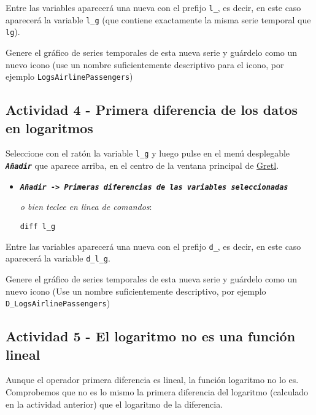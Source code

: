 \documentclass[11pt]{article}
\begin{document}
Entre las variables aparecerá una nueva con el prefijo \texttt{l\_}, es decir,
en este caso aparecerá la variable \texttt{l\_g} (que contiene exactamente la
misma serie temporal que \texttt{lg}).

Genere el gráfico de series temporales de esta nueva serie y guárdelo
como un nuevo icono (use un nombre suficientemente descriptivo para el
icono, por ejemplo \texttt{LogsAirlinePassengers})

{\vspace{0pt} \footnotesize \color{gray!70!black}
}

\subsection{Actividad 4 - Primera diferencia de los datos en logaritmos}
\label{sec:orgc6f27e0}

Seleccione con el ratón la variable \texttt{l\_g} y luego pulse en el menú desplegable \textbf{\emph{\texttt{Añadir}}} que aparece arriba, en el centro de la
ventana principal de \href{https://gretl.sourceforge.net/es.html}{Gretl}.
\begin{itemize}
\item \textbf{\emph{\texttt{Añadir -> Primeras diferencias de las variables seleccionadas}}}

{\vspace{0pt} \footnotesize \color{gray!70!black}
\emph{o bien teclee en linea de comandos}: 
\begin{verbatim}
diff l_g
\end{verbatim}
}
\end{itemize}

Entre las variables aparecerá una nueva con el prefijo \texttt{d\_}, es decir,
en este caso aparecerá la variable \texttt{d\_l\_g}.

Genere el gráfico de series temporales de esta nueva serie y guárdelo
como un nuevo icono (Use un nombre suficientemente descriptivo, por
ejemplo \texttt{D\_LogsAirlinePassengers})

{\vspace{0pt} \footnotesize \color{gray!70!black}
}

\subsection{Actividad 5 - El logaritmo no es una función lineal}
\label{sec:org2697646}

Aunque el operador primera diferencia es lineal, la función logaritmo
no lo es. Comprobemos que no es lo mismo la primera diferencia del
logaritmo (calculado en la actividad anterior) que el logaritmo de la
diferencia.
\end{document}
